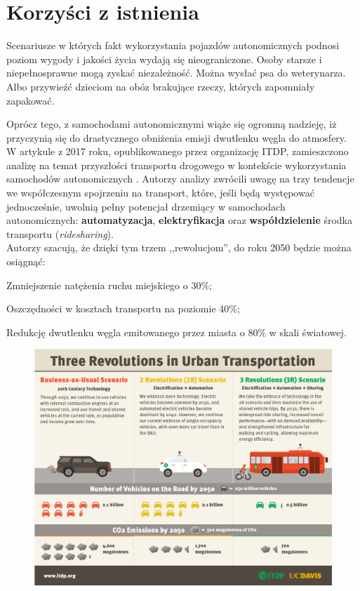 \section{Korzyści z istnienia}
Scenariusze w których fakt wykorzystania pojazdów autonomicznych podnosi poziom wygody i jakości życia wydają się nieograniczone. Osoby starsze i niepełnosprawne mogą zyskać niezależność. Można wysłać psa do weterynarza. Albo przywieźć dzieciom na obóz brakujące rzeczy, których zapomniały zapakować.

Oprócz tego, z samochodami autonomicznymi wiąże się ogromną nadzieję, iż przyczynią się do drastycznego obniżenia emisji dwutlenku węgla do atmosfery. W artykule z 2017 roku, opublikowanego przez organizację ITDP, zamieszczono analizę na temat przyszłości transportu drogowego w kontekście wykorzystania samochodów autonomicznych \cite{itdp:urbanTransportRevolutions}. Autorzy analizy zwrócili uwagę na trzy tendencje we współczesnym spojrzeniu na transport, które, jeśli będą występować jednocześnie, uwolnią pełny potencjał drzemiący w samochodach autonomicznych: \textbf{automatyzacja}, \textbf{elektryfikacja} oraz \textbf{współdzielenie} środka transportu (\textit{ridesharing}). \\
Autorzy szacują, że dzięki tym trzem ,,rewolucjom'', do roku 2050 będzie można osiągnąć:
\begin{enumerate*}
\item Zmniejszenie natężenia ruchu miejskiego o 30\%;
\item Oszczędności w kosztach transportu na poziomie 40\%;
\item Redukcję dwutlenku węgla emitowanego przez miasta o 80\% w skali światowej.
\end{enumerate*}

\begin{figure}[H]
\centering
\includegraphics[width=15cm]{resources/figures/itdp_infographic.jpg}
\end{figure}

